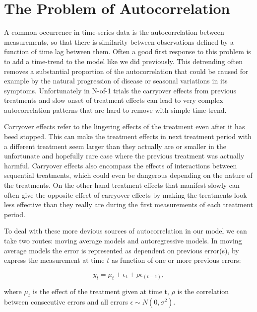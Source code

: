 \documentclass[12pt,a4paper,leqno]{report}
\theoremstyle{plain}
\theoremstyle{definition}
\theoremstyle{remark}
\begin{document}
\section{The Problem of Autocorrelation}\label{autocor}

A common occurrence in time-series data is the autocorrelation between measurements, so
that there is similarity between observations defined by a function of time lag between
them. Often a good first response to this problem is to add a time-trend to the model
like we did previously. This detrending often removes a substantial proportion of the
autocorrelation that could be caused for example by the natural progression of disease or
seasonal variations in its symptoms\cite{stat}. Unfortunately in N-of-1 trials the
carryover effects from previous treatments and slow onset of treatment effects can lead
to very complex autocorrelation patterns that are hard to remove with simple time-trend.

Carryover effects refer to the lingering effects of the treatment even after it has beed
stopped. This can make the treatment effects in next treatment period with a different
treatment seem larger than they actually are or smaller in the unfortunate and hopefully
rare case where the previous treatment was actually harmful. Carryover effects also
encompass the effects of interactions between sequential treatments, which could even be
dangerous depending on the nature of the treatments. On the other hand treatment effects
that manifest slowly can often give the opposite effect of carryover effects by making
the treatments look less effective than they really are during the first measurements of
each treatment period.\cite{stat}

To deal with these more devious sources of autocorrelation in our model we can take two
routes: moving average models and autoregressive models. In moving average models the
error is represented as dependent on previous error(s), by express the measurement at
time \(t\) as function of one or more previous errors:

\begin{def}\label{}
    \begin{equation}\label{}
        y_t = \mu_t + \epsilon_t + \rho\epsilon_{(t - 1)},
    \end{equation}
\end{def}where \(\mu_t\) is the effect of the treatment given at time t, \(\rho \) is the
correlation between consecutive errors and all errors \(\epsilon \sim N(0,\sigma^2) \).
\end{document}
